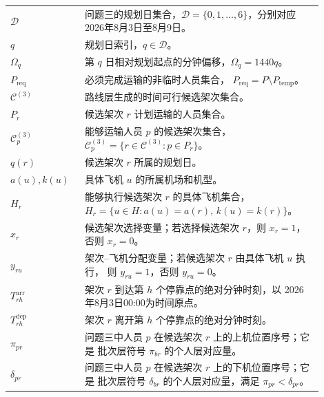 \documentclass[UTF8,a4paper,zihao=5]{ctexart}
\begin{document}
\begin{longtable}{
    >{\centering\arraybackslash}p{0.20\linewidth}
    p{0.70\linewidth}
}
$\mathcal{D}$
& 问题三的规划日集合，$\mathcal{D}=\{0,1,\ldots,6\}$，分别对应
2026年8月3日至8月9日。 \\

$q$
& 规划日索引，$q\in\mathcal{D}$。 \\

$\Omega_q$
& 第 $q$ 日相对规划起点的分钟偏移，$\Omega_q=1440q$。 \\

$P_{\mathrm{req}}$
& 必须完成运输的非临时人员集合，
$P_{\mathrm{req}}=P\setminus P_{\mathrm{temp}}$。 \\

$\mathcal{C}^{(3)}$
& 路线层生成的时间可行候选架次集合。 \\

$P_r$
& 候选架次 $r$ 计划运输的人员集合。 \\

$\mathcal{C}^{(3)}_p$
& 能够运输人员 $p$ 的候选架次集合，
$\mathcal{C}^{(3)}_p=\{r\in\mathcal{C}^{(3)}:p\in P_r\}$。 \\

$q(r)$
& 候选架次 $r$ 所属的规划日。 \\

$a(u),k(u)$
& 具体飞机 $u$ 的所属机场和机型。 \\

$H_r$
& 能够执行候选架次 $r$ 的具体飞机集合，
$H_r=\{u\in H:a(u)=a(r),\,k(u)=k(r)\}$。 \\

$x_r$
& 候选架次选择变量；若选择候选架次 $r$，则 $x_r=1$，
否则 $x_r=0$。 \\

$y_{ru}$
& 架次--飞机分配变量；若候选架次 $r$ 由具体飞机 $u$ 执行，
则 $y_{ru}=1$，否则 $y_{ru}=0$。 \\

$T_{rh}^{\mathrm{arr}}$
& 架次 $r$ 到达第 $h$ 个停靠点的绝对分钟时刻，以
2026年8月3日00:00为时间原点。 \\

$T_{rh}^{\mathrm{dep}}$
& 架次 $r$ 离开第 $h$ 个停靠点的绝对分钟时刻。 \\

$\pi_{pr}$
& 问题三中人员 $p$ 在候选架次 $r$ 上的上机位置序号；它是
批次层符号 $\pi_{br}$ 的个人层对应量。 \\

$\delta_{pr}$
& 问题三中人员 $p$ 在候选架次 $r$ 上的下机位置序号；它是
批次层符号 $\delta_{br}$ 的个人层对应量，满足 $\pi_{pr}<\delta_{pr}$。 \\


\end{longtable}
\end{document}
